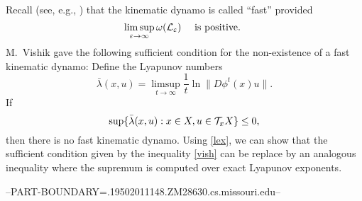 Recall (see, e.g., \cite{Arnold,AZRS,BC}) that the
kinematic dynamo is called
``fast'' provided 
\[
\limsup_{\varepsilon\to\infty}\omega({\cal{L}}_\varepsilon)\quad \mbox{
is positive. }\]
M.~Vishik \cite{Vishik} gave the following sufficient condition for
the non-existence of a fast kinematic dynamo:
Define the Lyapunov numbers
\[
\bar{\lambda}(x,u)=\limsup_{t\to\infty}
\dfrac{1}{t}\ln\|D\phi^t(x)u\|.
\]
If
\begin{equation}\lb{vish}
\sup \{
\bar{\lambda}(x,u):
x\in X, u\in \calT_x X
\}\leq 0,
\end{equation}
then there is no fast kinematic dynamo.
Using \eqref{lex}, we can show that
the sufficient condition given by the inequality
\eqref{vish} can be replace by an analogous inequality where
the supremum is computed over exact Lyapunov exponents.



--PART-BOUNDARY=.19502011148.ZM28630.cs.missouri.edu--



